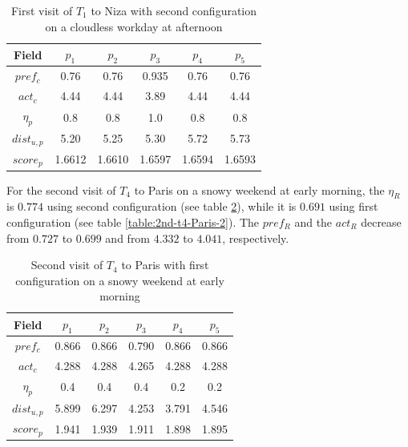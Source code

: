 \begin{table}[h!]
    \centering
    \begin{tabular}{ |c|c|c|c|c|c| } 
        \hline
        Field   & $p_1$ & $p_2$ & $p_3$ & $p_4$ & $p_5$ \\
        \hline
        $pref_c$    &  0.76 & 0.76 & 0.935 & 0.76 & 0.76 \\
        $act_c$     & 4.44 & 4.44 & 3.89 & 4.44 & 4.44  \\
        $\eta_p$    & 0.8 & 0.8 & 1.0 & 0.8 & 0.8 \\
        $dist_{u,p}$ & 5.20 & 5.25 & 5.30 & 5.72 & 5.73 \\
        $score_p$    & 1.6612 & 1.6610 & 1.6597 & 1.6594 & 1.6593 \\
        
        \hline
    \end{tabular}
    \caption{First visit of $T_1$ to Niza with second configuration on a cloudless workday at afternoon}
    \label{table:2nd-t1-niza-1}
\end{table}

For the second visit of $T_4$ to Paris on a snowy weekend at early morning, the $\eta_R$ is $0.774$ using second configuration (see table \ref{table:1st-t4-Paris-2}), while it is $0.691$ using first configuration (see table \ref{table:2nd-t4-Paris-2}). The $pref_R$ and the $act_R$ decrease from $0.727$ to $0.699$ and from $4.332$ to $4.041$, respectively.

\begin{table}[h!]
    \centering
    \begin{tabular}{ |c|c|c|c|c|c| } 
        \hline
        Field   & $p_1$ & $p_2$ & $p_3$ & $p_4$ & $p_5$ \\
        \hline
        $pref_c$    &  0.866 & 0.866 & 0.790 & 0.866 & 0.866 \\
        $act_c$     & 4.288 & 4.288 & 4.265 & 4.288 & 4.288  \\
        $\eta_p$    & 0.4 & 0.4 & 0.4 & 0.2 & 0.2 \\
        $dist_{u,p}$ & 5.899 & 6.297 & 4.253 & 3.791 & 4.546 \\
        $score_p$    & 1.941 & 1.939 & 1.911 & 1.898 & 1.895 \\
        
        \hline
    \end{tabular}
    \caption{Second visit of $T_4$ to Paris with first configuration on a snowy weekend at early morning}
    \label{table:1st-t4-Paris-2}
\end{table}

